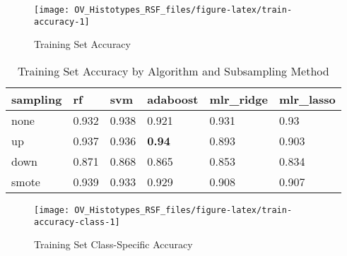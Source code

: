 \documentclass[
]{report}
\begin{document}
\begin{figure}[H]

{\centering \texttt{[image: OV\_Histotypes\_RSF\_files/figure-latex/train-accuracy-1]} 

}

\caption{Training Set Accuracy}\label{fig:train-accuracy}
\end{figure}

\begin{table}

\caption{\label{tab:train-accuracy-table}Training Set Accuracy by Algorithm and Subsampling Method}
\centering
\begin{tabular}[t]{l|l|l|l|l|l}
\hline
sampling & rf & svm & adaboost & mlr\_ridge & mlr\_lasso\\
\hline
none & 0.932 & 0.938 & 0.921 & 0.931 & 0.93\\
\hline
up & 0.937 & 0.936 & \textbf{0.94} & 0.893 & 0.903\\
\hline
down & 0.871 & 0.868 & 0.865 & 0.853 & 0.834\\
\hline
smote & 0.939 & 0.933 & 0.929 & 0.908 & 0.907\\
\hline
\end{tabular}
\end{table}

\begin{figure}[H]

{\centering \texttt{[image: OV\_Histotypes\_RSF\_files/figure-latex/train-accuracy-class-1]} 

}

\caption{Training Set Class-Specific Accuracy}\label{fig:train-accuracy-class}
\end{figure}
\end{document}
